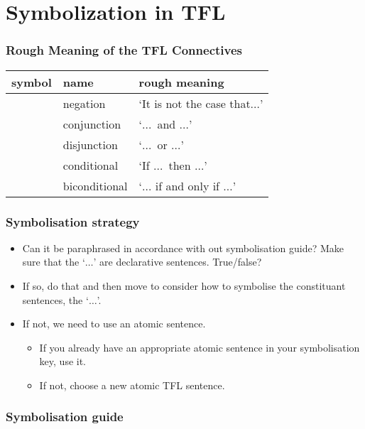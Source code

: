 \vspace*{2cm}
\section{Symbolization in TFL}
\subsubsection*{Rough Meaning of the TFL Connectives}
		\begin{tabular}{cll}
		\textbf{symbol}&\textbf{name}&\textbf{rough meaning}\\
		\hline
		\enot&negation&`It is not the case that$\ldots$'\\
		\eand&conjunction&`$\ldots$\ and $\ldots$'\\
		\eor&disjunction&`$\ldots$\ or $\ldots$'\\
		\eif&conditional&`If $\ldots$\ then $\ldots$'\\
		\eiff&biconditional&`$\ldots$ if and only if $\ldots$'\\
		\end{tabular}
		
		

\label{app.symbolization}

\subsubsection*{Symbolisation strategy}

\begin{itemize}
	\item Can it be paraphrased in accordance with out symbolisation guide?
	Make sure that the `$\ldots$' are declarative sentences. True/false?
	\item If so, do that and then move to consider how to symbolise the constituant sentences, the `$\ldots$'.
	\item If not, we need to use an atomic sentence.  
	\begin{itemize}
		\item If you already have an appropriate atomic sentence in your symbolisation key, use it.
		\item If not, choose a new atomic TFL sentence. 
	\end{itemize}
\end{itemize}


\subsubsection*{Symbolisation guide}

